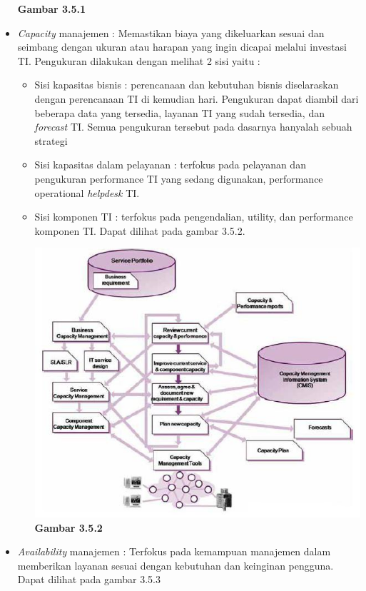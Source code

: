 \begin{itemize}
\begin{center}
\textbf{Gambar 3.5.1}
\end{center}
\item \textit{Capacity} manajemen : Memastikan biaya yang dikeluarkan sesuai dan seimbang dengan ukuran atau harapan yang ingin dicapai melalui investasi TI. Pengukuran dilakukan dengan melihat 2 sisi yaitu :
\begin{itemize}
\item Sisi kapasitas bisnis : perencanaan dan kebutuhan bisnis diselaraskan dengan perencanaan TI di kemudian hari. Pengukuran dapat diambil dari beberapa data yang tersedia, layanan TI yang sudah tersedia, dan \textit{forecast} TI. Semua pengukuran tersebut pada dasarnya hanyalah sebuah strategi
\item Sisi kapasitas dalam pelayanan : terfokus pada pelayanan dan pengukuran performance TI yang sedang digunakan, performance operational \textit{helpdesk} TI.
\item Sisi komponen TI : terfokus pada pengendalian, utility, dan performance komponen TI. Dapat dilihat pada gambar 3.5.2.
\begin{center}
\includegraphics[scale=1]{Gambar352.jpg}\\ 
\textbf{Gambar 3.5.2}
\end{center}
\end{itemize}
\item \textit{Availability} manajemen : Terfokus pada kemampuan manajemen dalam memberikan layanan sesuai dengan kebutuhan dan keinginan pengguna. Dapat dilihat pada gambar 3.5.3
\begin{center}

\end{center}
\end{itemize}
